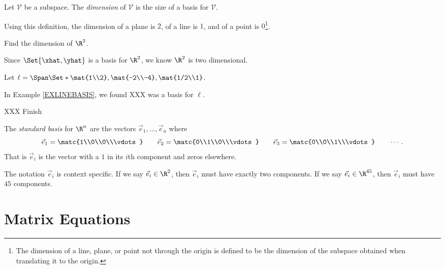 	\begin{definition}[Dimension]
		Let $\mathcal V$ be a subspace. The \emph{dimension} of $\mathcal V$
		is the size of a basis for $\mathcal V$.
	\end{definition}

	Using this definition, the dimension of a plane is $2$, of a line is $1$,
	and of a point is $0$\footnote{ The dimension of a line, plane, or point
	not through the origin is defined to be the dimension of the subspace obtained
	when translating it to the origin.}.

	\begin{example}
		Find the dimension of $\R^2$.

		Since $\Set{\xhat, \yhat}$ is a basis for $\R^2$, we know $\R^2$ is
		two dimensional.
	\end{example}

	\begin{example}
		Let $\ell=\Span\Set*{\mat{1\\2},\mat{-2\\-4}, \mat{1/2\\1}}$.

		In Example \ref{EXLINEBASIS}, we found XXX was a basis for $\ell$.

		XXX Finish
	\end{example}

	\begin{definition}
		The \emph{standard basis} for $\R^n$ are the 
		vectors $\vec e_1,\ldots,\vec e_n$ where
		\[
			\vec e_1=\matc{1\\0\\0\\\vdots}\qquad
			\vec e_2=\matc{0\\1\\0\\\vdots}\qquad
			\vec e_3=\matc{0\\0\\1\\\vdots}\qquad\cdots.
		\]
		That is $\vec e_i$ is the vector with a $1$ in its
		$i$th component and zeros elsewhere.
	\end{definition}

	The notation $\vec e_i$ is context specific. If we say $\vec e_i\in\R^2$,
	then $\vec e_i$ must have exactly two components. If we say $\vec e_i\in\R^{45}$,
	then $\vec e_i$ must have $45$ components. 

\section{Matrix Equations}

